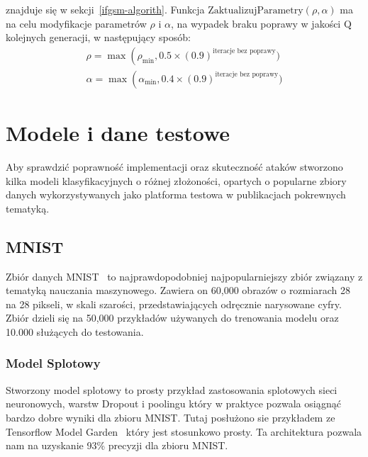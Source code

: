 \documentclass[
    left=2.5cm,         %
    right=2.5cm,        %
    top=2.5cm,          %
    bottom=3cm,         %
    bindingoffset=6mm,  %
    nohyphenation=false %
]{eiti/eiti-thesis}
\begin{document}
znajduje się w sekcji~\ref{ifgsm-algorith}. Funkcja $\text{ZaktualizujParametry}(\rho, \alpha)$ ma na celu
modyfikacje parametrów $\rho$ i \(\alpha\), na wypadek braku poprawy w jakości $\text{Q}$ kolejnych generacji, w następujący sposób:
\begin{equation}
\begin{array}{C}
    \rho = \max \left(\rho_{\min }, 0.5 \times(0.9)^{\text{iteracje bez poprawy}}) \\
    \alpha = \max \left(\alpha_{\min }, 0.4 \times(0.9)^{\text{iteracje bez poprawy}})
\end{array}
\end{equation}



\newpage

\section{Modele i dane testowe}
Aby sprawdzić poprawność implementacji oraz skuteczność ataków stworzono
kilka modeli klasyfikacyjnych o różnej złożoności, opartych o popularne zbiory danych
wykorzystywanych jako platforma testowa w publikacjach pokrewnych tematyką.

    \subsection{MNIST}
    Zbiór danych MNIST~\cite{mnist} to najprawdopodobniej najpopularniejszy zbiór związany z
    tematyką nauczania maszynowego.
    Zawiera on 60,000 obrazów o rozmiarach 28 na 28 pikseli, w skali szarości, przedstawiających
    odręcznie narysowane cyfry. Zbiór dzieli się na 50,000 przykładów używanych do
    trenowania modelu oraz 10.000 służących do testowania.

        \subsubsection{Model Splotowy}\label{MNIST_TF}
        Stworzony model splotowy to prosty przykład zastosowania splotowych sieci neuronowych, warstw Dropout i poolingu
        który w praktyce pozwala osiągnąć bardzo dobre wyniki dla zbioru MNIST. Tutaj posłużono sie przykładem ze
        Tensorflow Model Garden~\cite{tensorflow_model_garden} który jest stosunkowo prosty. Ta architektura pozwala nam
        na uzyskanie 93\% precyzji dla zbioru MNIST.
\end{document}
